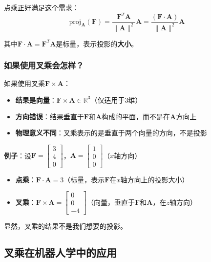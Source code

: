 \documentclass[12pt,a4paper]{article}
\begin{document}
点乘正好满足这个需求：
\begin{equation}
\text{proj}_{\bm{A}}(\bm{F}) = \frac{\bm{F}^T \bm{A}}{\|\bm{A}\|^2} \bm{A} = \frac{(\bm{F} \cdot \bm{A})}{\|\bm{A}\|^2} \bm{A}
\end{equation}

其中$\bm{F} \cdot \bm{A} = \bm{F}^T \bm{A}$是标量，表示投影的\textbf{大小}。

\subsubsection{如果使用叉乘会怎样？}

如果使用叉乘$\bm{F} \times \bm{A}$：
\begin{itemize}
\item \textbf{结果是向量}：$\bm{F} \times \bm{A} \in \mathbb{R}^3$（仅适用于3维）
\item \textbf{方向错误}：结果垂直于$\bm{F}$和$\bm{A}$构成的平面，而不是在$\bm{A}$方向上
\item \textbf{物理意义不同}：叉乘表示的是垂直于两个向量的方向，不是投影
\end{itemize}

\textbf{例子}：设$\bm{F} = \begin{bmatrix} 3 \\ 4 \\ 0 \end{bmatrix}$，$\bm{A} = \begin{bmatrix} 1 \\ 0 \\ 0 \end{bmatrix}$（$x$轴方向）

\begin{itemize}
\item \textbf{点乘}：$\bm{F} \cdot \bm{A} = 3$（标量，表示$\bm{F}$在$x$轴方向上的投影大小）
\item \textbf{叉乘}：$\bm{F} \times \bm{A} = \begin{bmatrix} 0 \\ 0 \\ -4 \end{bmatrix}$（向量，垂直于$\bm{F}$和$\bm{A}$，在$z$轴方向）
\end{itemize}

显然，叉乘的结果不是我们想要的投影。

\subsection{叉乘在机器人学中的应用}
\end{document}
